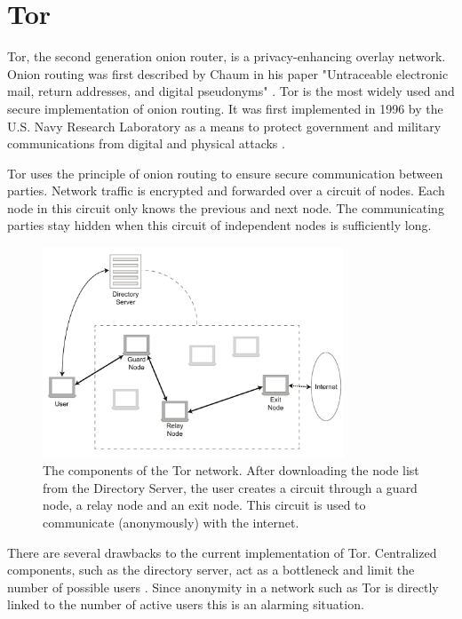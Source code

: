 \section{Tor}
	\label{scc:tor}
	Tor, the second generation onion router, is a privacy-enhancing overlay network. Onion routing was first described by Chaum in his paper "Untraceable electronic mail, return addresses, and digital pseudonyms" \cite{chaum1981untraceable}. Tor is the most widely used and secure implementation of onion routing. It was first implemented in 1996 by the U.S. Navy Research Laboratory as a means to protect government and military communications from digital and physical attacks \cite{goldschlag1996hiding}.
	
	Tor uses the principle of onion routing to ensure secure communication between parties. Network traffic is encrypted and forwarded over a circuit of nodes. Each node in this circuit only knows the previous and next node. The communicating parties stay hidden when this circuit of independent nodes is sufficiently long.
	
	\begin{figure}[!t]
		\centering
		\includegraphics[width=0.8\textwidth]{prior-work/tor.pdf}
		\caption{The components of the Tor network. After downloading the node list from the Directory Server, the user creates a circuit through a guard node, a relay node and an exit node. This circuit is used to communicate (anonymously) with the internet.}
		\label{fig:tor_layout}
	\end{figure}
	
	There are several drawbacks to the current implementation of Tor. Centralized components, such as the directory server, act as a bottleneck and limit the number of possible users \cite{jagerman2014fifteen}. Since anonymity in a network such as Tor is directly linked to the number of active users this is an alarming situation.
